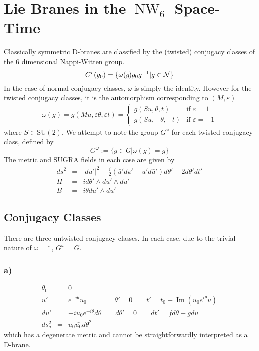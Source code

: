 \documentclass[11pt, a4paper]{article}
\DeclareMathOperator{\NW}{NW}
\DeclareMathOperator{\im}{Im}
\newcommand{\SU}{\mathrm{SU}}
\newcommand{\1}{\mathbb{1}}
\begin{document}
\section{Lie Branes in the $\NW_6$ Space-Time}
Classically symmetric D-branes are classified by the (twisted) conjugacy classes
of the 6 dimensional Nappi-Witten group.
\begin{equation}
  \label{eq:twistedconjugacy}
  C^r(g_0)=\{\omega(g)g_0g^{-1}|g\in {\cal N}\}
\end{equation}
In the case of normal conjugacy classes, $\omega$ is simply the identity.
However for the twisted conjugacy classes, it is the automorphism corresponding
to $(M,\varepsilon)$
\begin{eqnarray}
  \label{eq:automorphism}
  \omega(g)=g(Mu,\varepsilon\theta, \varepsilon t)=
  \begin{cases}
    g(Su, \theta, t) & \text{if $\varepsilon=1$}\\
    g(S\bar u, -\theta, -t) & \text{if $\varepsilon=-1$}
  \end{cases}
\end{eqnarray}
where $S\in\SU(2)$. We attempt to note the group $G^\omega$ for each twisted
conjugacy class, defined by
\begin{equation}
  \label{eq:Gomega}
  G^\omega:=\{g\in G|\omega(g)=g\}
\end{equation}
The metric and SUGRA fields in each case are given by
\begin{eqnarray}
  \label{eq:G}
  ds^2&=&|du'|^2-\frac i2 (\bar u'du'-u'd\bar u')d\theta'-2d\theta'dt'\\
  \label{eq:H}
  H&=&id\theta'\wedge du'\wedge d\bar u'\\
  \label{eq:B}
  B&=&i\theta du'\wedge d\bar u'
\end{eqnarray}

\subsection{Conjugacy Classes}
There are three untwisted conjugacy classes. In each case, due to the trivial
nature of $\omega=\1$, $G^\omega=G$.
\subsubsection{a)}
\begin{eqnarray}
  \label{eq:a}
  \theta_0&=&0\\\nonumber
  u'&=&e^{-i\theta}u_0\qquad\qquad\theta'=0\qquad t'=t_0-\im(\bar{u_0}e^{i\theta}u)\\\nonumber
  du'&=&-iu_0e^{-i\theta}d\theta\qquad d\theta'=0\qquad dt'=fd\theta+gdu\\\nonumber
  ds^2_a&=&u_0\bar{u_0}d\theta^2
\end{eqnarray}
which has a degenerate metric and cannot be straightforwardly interpreted as a
D-brane.
\end{document}
